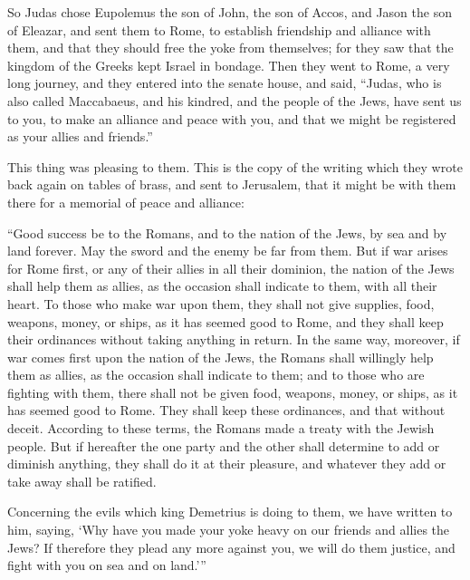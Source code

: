  So Judas chose Eupolemus the son of John, the son of
Accos, and Jason the son of Eleazar, and sent them to Rome, to establish
friendship and alliance with them,  and that they should
free the yoke from themselves; for they saw that the kingdom of the
Greeks kept Israel in bondage.  Then they went to Rome, a
very long journey, and they entered into the senate house, and said,
 ``Judas, who is also called Maccabaeus, and his kindred,
and the people of the Jews, have sent us to you, to make an alliance and
peace with you, and that we might be registered as your allies and
friends.''

 This thing was pleasing to them.  This is
the copy of the writing which they wrote back again on tables of brass,
and sent to Jerusalem, that it might be with them there for a memorial
of peace and alliance:

 ``Good success be to the Romans, and to the nation of
the Jews, by sea and by land forever. May the sword and the enemy be far
from them.  But if war arises for Rome first, or any of
their allies in all their dominion,  the nation of the
Jews shall help them as allies, as the occasion shall indicate to them,
with all their heart.  To those who make war upon them,
they shall not give supplies, food, weapons, money, or ships, as it has
seemed good to Rome, and they shall keep their ordinances without taking
anything in return.  In the same way, moreover, if war
comes first upon the nation of the Jews, the Romans shall willingly help
them as allies, as the occasion shall indicate to them; 
and to those who are fighting with them, there shall not be given food,
weapons, money, or ships, as it has seemed good to Rome. They shall keep
these ordinances, and that without deceit.  According to
these terms, the Romans made a treaty with the Jewish people.
 But if hereafter the one party and the other shall
determine to add or diminish anything, they shall do it at their
pleasure, and whatever they add or take away shall be ratified.

 Concerning the evils which king Demetrius is doing to
them, we have written to him, saying, `Why have you made your yoke heavy
on our friends and allies the Jews?  If therefore they
plead any more against you, we will do them justice, and fight with you
on sea and on land.'''

